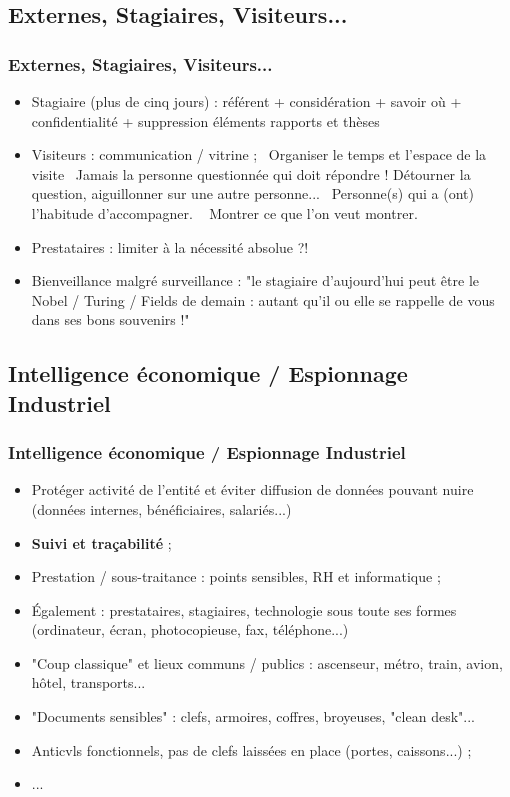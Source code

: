 \documentclass[slidetop,11pt]{beamer}
\begin{document}
\subsection{Externes, Stagiaires, Visiteurs... }
\begin{frame}
	\frametitle{Externes, Stagiaires, Visiteurs... }
	\begin{itemize}
		\item Stagiaire (plus de cinq jours) : r{\'e}f{\'e}rent + consid{\'e}ration + savoir o{\`u} + confidentialit{\'e} + suppression {\'e}l{\'e}ments rapports et th{\`e}ses
		\item Visiteurs : communication / vitrine ;~\newline
			Organiser le temps et l'espace de la visite~\newline
			Jamais la personne questionn{\'e}e qui doit r{\'e}pondre ! D{\'e}tourner la question, aiguillonner sur une autre personne...~\newline
			Personne(s) qui a (ont) l'habitude d'accompagner. ~\newline
			Montrer ce que l'on veut montrer. 
		\item Prestataires : limiter {\`a} la n{\'e}cessit{\'e} absolue ?!
		\item Bienveillance malgr{\'e} surveillance : "le stagiaire d'aujourd'hui peut {\^e}tre le Nobel / Turing / Fields de demain : autant qu'il ou elle se rappelle de vous dans ses bons souvenirs !" 
	\end{itemize}
\end{frame}

\subsection{Intelligence {\'e}conomique / Espionnage Industriel}
\begin{frame}
	\frametitle{Intelligence {\'e}conomique / Espionnage Industriel}
	\begin{itemize}
		\item Prot{\'e}ger activit{\'e} de l'entit{\'e} et {\'e}viter diffusion de donn{\'e}es pouvant nuire (donn{\'e}es internes, b{\'e}n{\'e}ficiaires, salari{\'e}s...)
		\item \textbf{Suivi et tra\c{c}abilit{\'e}} ; 
		\item Prestation / sous-traitance : points sensibles, RH et informatique ; 
		\item {\'E}galement : prestataires, stagiaires, technologie sous toute ses formes (ordinateur, {\'e}cran, photocopieuse, fax, t{\'e}l{\'e}phone...)
		\item "Coup classique" et lieux communs / publics : ascenseur, m{\'e}tro, train, avion, h{\^o}tel, transports...
		\item "Documents sensibles" : clefs, armoires, coffres, broyeuses, "clean desk"...
		\item Anticvls fonctionnels, pas de clefs laiss{\'e}es en place (portes, caissons...) ; 
		\item ...
	\end{itemize}
\end{frame}
\end{document}
